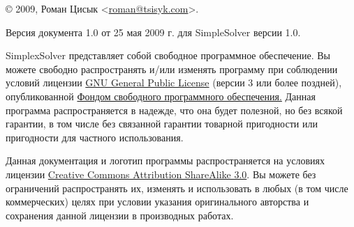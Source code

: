 \documentclass[pdftex, unicode, a4paper,12pt,oneside,utf8x, usehyperref]{report-gost}
\begin{document}
© 2009, Роман Цисык <\href{mailto:roman@tsisyk.com}{roman@tsisyk.com}>.

Версия документа 1.0 от 25 мая 2009 г. для SimpleSolver версии 1.0.

SimplexSolver представляет собой свободное программное обеспечение.
Вы можете свободно распространять и/или изменять программу при соблюдении условий лицензии \href{http://www.gnu.org/licenses/gpl.html}{GNU General Public License}
(версии 3 или более поздней), опубликованной
\href{http://www.fsf.org/}{Фондом свободного программного обеспечения.}
Данная программа распространяется в надежде, что она будет полезной,
но без всякой гарантии, в том числе без связанной гарантии товарной пригодности
или пригодности для частного использования.

Данная документация и логотип программы распространяется на условиях лицензии \href{http://www.creativecommons.org/licenses/by-sa/3.0/}{Creative Commons Attribution ShareAlike 3.0}.
Вы можете без ограничений распространять их, изменять и использовать в любых (в том числе коммерческих) целях при условии указания оригинального авторства и сохранения данной лицензии в производных работах.

\newpage

\frontmatter %

\tableofcontents

\mainmatter %










\backmatter
\end{document}
